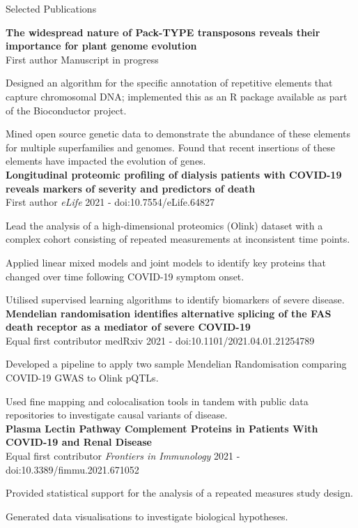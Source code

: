 \documentclass{resume}
\begin{document}
\begin{rSection}{Selected Publications}

\textbf{The widespread nature of Pack-TYPE transposons reveals their importance for plant genome evolution} \\
First author \hfill  Manuscript in progress

\smallskip
\item Designed an algorithm for the specific annotation of repetitive elements that capture chromosomal DNA; implemented this as an R package available as part of the Bioconductor project.
\item Mined open source genetic data to demonstrate the abundance of these elements for multiple superfamilies and genomes. Found that recent insertions of these elements have impacted the evolution of genes. \\

\textbf{Longitudinal proteomic profiling of dialysis patients with COVID-19 reveals markers of severity and predictors of death} \\
First author \hfill  \textit{eLife} 2021 - doi:10.7554/eLife.64827

\smallskip
\item Lead the analysis of a high-dimensional proteomics (Olink) dataset with a complex cohort consisting of repeated measurements at inconsistent time points.
\item Applied linear mixed models and joint models to identify key proteins that changed over time following COVID-19 symptom onset.
\item Utilised supervised learning algorithms to identify biomarkers of severe disease.\\
 
\textbf{Mendelian randomisation identifies alternative splicing of the FAS death receptor as a mediator of severe COVID-19} \\
Equal first contributor \hfill  medRxiv 2021 - doi:10.1101/2021.04.01.21254789

\smallskip
\item Developed a pipeline to apply two sample Mendelian Randomisation comparing COVID-19 GWAS to Olink pQTLs. 
\item Used fine mapping and colocalisation tools in tandem with public data repositories to investigate causal variants of disease. \\

\textbf{Plasma Lectin Pathway Complement Proteins in Patients With COVID-19 and Renal Disease} \\
Equal first contributor \hfill  \textit{Frontiers in Immunology} 2021 - doi:10.3389/fimmu.2021.671052

\smallskip
\item Provided statistical support for the analysis of a repeated measures study design.
\item Generated data visualisations to investigate biological hypotheses. \\

\end{rSection}
\end{document}

